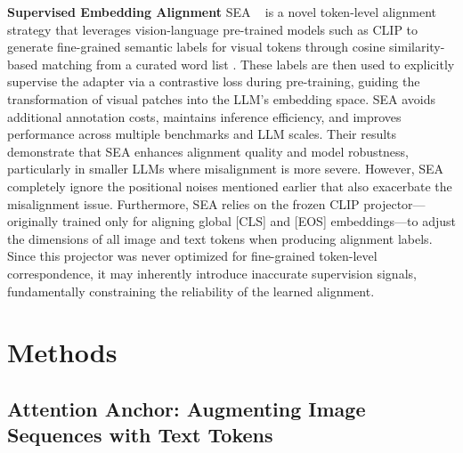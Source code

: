 \documentclass[11pt]{article}
\begin{document}
\textbf{Supervised Embedding Alignment} SEA ~\citep{yin2024sea} is a novel token-level alignment strategy that leverages vision-language pre-trained models such as CLIP to generate fine-grained semantic labels for visual tokens through cosine similarity-based matching from a curated word list \citep{yin2024sea}. These labels are then used to explicitly supervise the adapter via a contrastive loss during pre-training, guiding the transformation of visual patches into the LLM's embedding space. SEA avoids additional annotation costs, maintains inference efficiency, and improves performance across multiple benchmarks and LLM scales. Their results demonstrate that SEA enhances alignment quality and model robustness, particularly in smaller LLMs where misalignment is more severe. However, SEA completely ignore the positional noises mentioned earlier that also exacerbate the misalignment issue. Furthermore, SEA relies on the frozen CLIP projector—originally trained only for aligning global [CLS] and [EOS] embeddings—to adjust the dimensions of all image and text tokens when producing alignment labels. Since this projector was never optimized for fine-grained token-level correspondence, it may inherently introduce inaccurate supervision signals, fundamentally constraining the reliability of the learned alignment.


\section{Methods}

\subsection{Attention Anchor: Augmenting Image Sequences with Text Tokens}
\end{document}
